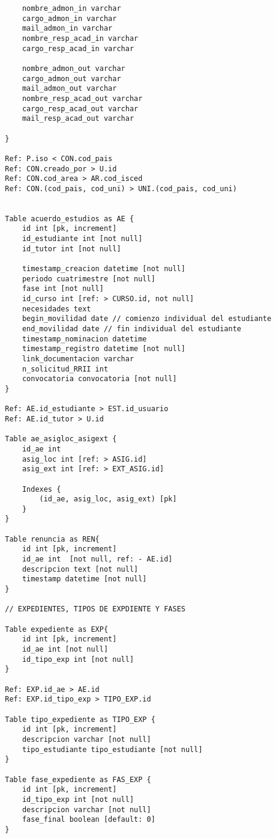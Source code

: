 \begin{lstlisting}
			nombre_admon_in varchar
			cargo_admon_in varchar
			mail_admon_in varchar
			nombre_resp_acad_in varchar
			cargo_resp_acad_in varchar
			
			nombre_admon_out varchar
			cargo_admon_out varchar
			mail_admon_out varchar
			nombre_resp_acad_out varchar
			cargo_resp_acad_out varchar
			mail_resp_acad_out varchar
			
		}
		
		Ref: P.iso < CON.cod_pais
		Ref: CON.creado_por > U.id
		Ref: CON.cod_area > AR.cod_isced
		Ref: CON.(cod_pais, cod_uni) > UNI.(cod_pais, cod_uni)
		
		
		Table acuerdo_estudios as AE {
			id int [pk, increment]
			id_estudiante int [not null]
			id_tutor int [not null]
			
			timestamp_creacion datetime [not null]
			periodo cuatrimestre [not null]
			fase int [not null]
			id_curso int [ref: > CURSO.id, not null]
			necesidades text
			begin_movilidad date // comienzo individual del estudiante
			end_movilidad date // fin individual del estudiante
			timestamp_nominacion datetime 
			timestamp_registro datetime [not null]
			link_documentacion varchar
			n_solicitud_RRII int
			convocatoria convocatoria [not null]
		}
		
		Ref: AE.id_estudiante > EST.id_usuario
		Ref: AE.id_tutor > U.id
		
		Table ae_asigloc_asigext {
			id_ae int
			asig_loc int [ref: > ASIG.id]
			asig_ext int [ref: > EXT_ASIG.id]
			
			Indexes {
				(id_ae, asig_loc, asig_ext) [pk]
			}
		}
		
		Table renuncia as REN{
			id int [pk, increment]
			id_ae int  [not null, ref: - AE.id]
			descripcion text [not null]
			timestamp datetime [not null]
		}
		
		// EXPEDIENTES, TIPOS DE EXPDIENTE Y FASES
		
		Table expediente as EXP{
			id int [pk, increment]
			id_ae int [not null]
			id_tipo_exp int [not null]
		}
		
		Ref: EXP.id_ae > AE.id
		Ref: EXP.id_tipo_exp > TIPO_EXP.id
		
		Table tipo_expediente as TIPO_EXP {
			id int [pk, increment]
			descripcion varchar [not null]
			tipo_estudiante tipo_estudiante [not null]
		}
		
		Table fase_expediente as FAS_EXP {
			id int [pk, increment]
			id_tipo_exp int [not null]
			descripcion varchar [not null]
			fase_final boolean [default: 0]
		}
		

\end{lstlisting}

